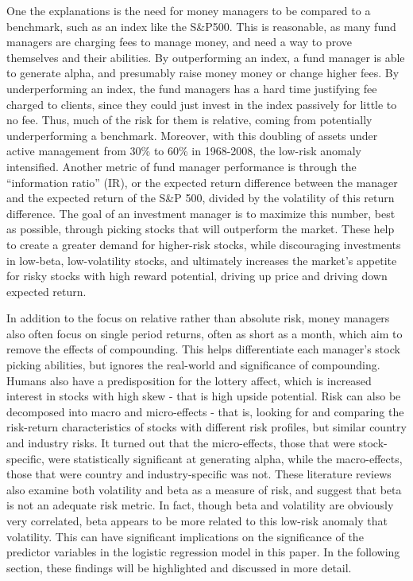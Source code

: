 \documentclass[12pt,twoside]{reedthesis}
\theoremstyle{definition}
\theoremstyle{definition}
\theoremstyle{definition}
\theoremstyle{remark}
\begin{document}
One the explanations is the need for money managers to be compared to a
benchmark, such as an index like the S\&P500. This is reasonable, as
many fund managers are charging fees to manage money, and need a way to
prove themselves and their abilities. By outperforming an index, a fund
manager is able to generate alpha, and presumably raise money money or
change higher fees. By underperforming an index, the fund managers has a
hard time justifying fee charged to clients, since they could just
invest in the index passively for little to no fee. Thus, much of the
risk for them is relative, coming from potentially underperforming a
benchmark. Moreover, with this doubling of assets under active
management from 30\% to 60\% in 1968-2008, the low-risk anomaly
intensified. Another metric of fund manager performance is through the
``information ratio'' (IR), or the expected return difference between
the manager and the expected return of the S\&P 500, divided by the
volatility of this return difference. The goal of an investment manager
is to maximize this number, best as possible, through picking stocks
that will outperform the market. These help to create a greater demand
for higher-risk stocks, while discouraging investments in low-beta,
low-volatility stocks, and ultimately increases the market's appetite
for risky stocks with high reward potential, driving up price and
driving down expected return.

In addition to the focus on relative rather than absolute risk, money
managers also often focus on single period returns, often as short as a
month, which aim to remove the effects of compounding. This helps
differentiate each manager's stock picking abilities, but ignores the
real-world and significance of compounding. Humans also have a
predisposition for the lottery affect, which is increased interest in
stocks with high skew - that is high upside potential. Risk can also be
decomposed into macro and micro-effects - that is, looking for and
comparing the risk-return characteristics of stocks with different risk
profiles, but similar country and industry risks. It turned out that the
micro-effects, those that were stock-specific, were statistically
significant at generating alpha, while the macro-effects, those that
were country and industry-specific was not. These literature reviews
also examine both volatility and beta as a measure of risk, and suggest
that beta is not an adequate risk metric. In fact, though beta and
volatility are obviously very correlated, beta appears to be more
related to this low-risk anomaly that volatility. This can have
significant implications on the significance of the predictor variables
in the logistic regression model in this paper. In the following
section, these findings will be highlighted and discussed in more
detail.
\end{document}
